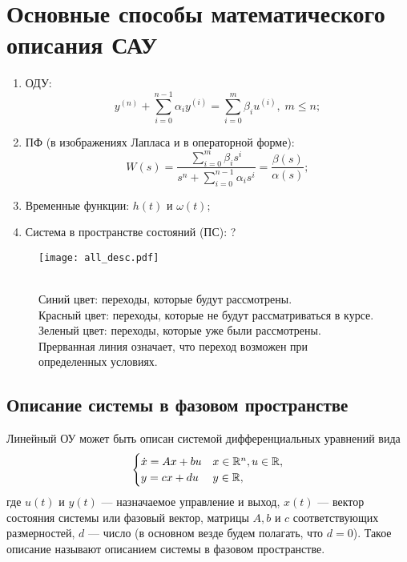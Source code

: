 \documentclass[../../TAU.tex]{subfiles}
\begin{document}
\section{Основные способы математического описания САУ}

    \begin{enumerate}
        \item ОДУ:
            $$
                y^{(n)}+\sum_{i=0}^{n-1}\alpha_iy^{(i)}=\sum_{i=0}^{m}\beta_iu^{(i)},\; m \le n;
            $$
        \item ПФ (в изображениях Лапласа и в операторной форме):
            $$
                W(s) = \frac{\sum_{i=0}^{m}\beta_is^i}{s^n+\sum_{i=0}^{n-1}\alpha_is^{i}} = \frac{\beta(s)}{\alpha(s)};
            $$
        \item Временные функции: $h(t)$ и $\omega(t)$;
        \item Система в пространстве состояний (ПС): ?
    \end{enumerate}

    \begin{center}
    \begin{figure}[H]
        \centering
        \texttt{[image: all\_desc.pdf]}
        \caption
        {    
            {\\\color{blue} Синий цвет}: переходы, которые будут рассмотрены.\\
            {\color{red} Красный цвет}: переходы, которые не будут рассматриваться в курсе.\\
            {\color{green} Зеленый цвет}: переходы, которые уже были рассмотрены.\\
            Прерванная линия означает, что переход возможен при определенных условиях.
        }
    \end{figure}
    \end{center}

\subsection{Описание системы в фазовом пространстве}
    
    Линейный ОУ может быть описан системой дифференциальных уравнений вида
    \begin{equation}\label{ST_DS}
        \begin{cases}
            \dot x = Ax+bu& x\in\mathbb{R}^{n},u\in\mathbb{R},\\
            y = cx +d u& y\in\mathbb{R},
        \end{cases}
    \end{equation}
    где $u(t)$ и $y(t)$ --- назначаемое управление и выход, $x(t)$ --- вектор состояния системы или фазовый вектор, матрицы $A,b$ и $c$ соответствующих размерностей, $d$ --- число (в основном везде будем полагать, что $d=0$). Такое описание называют описанием системы в фазовом пространстве.
\end{document}

